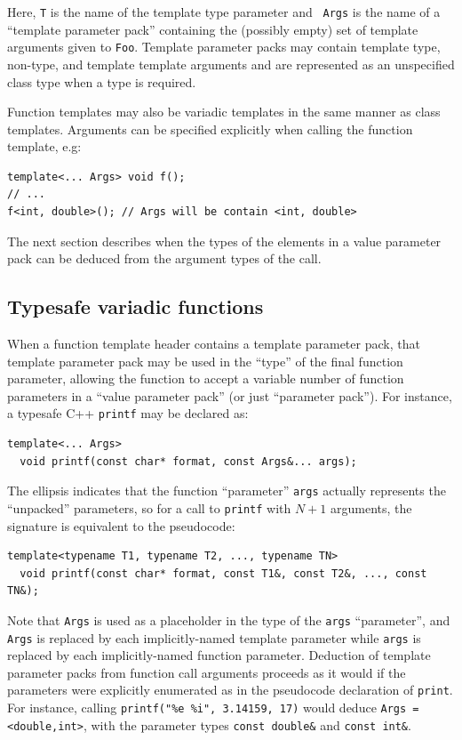 \documentclass{article}
\begin{document}
\noindent
Here, {\tt T} is the name of the template type parameter and {\tt
  Args} is the name of a ``template parameter pack'' containing the
(possibly empty) set of template arguments given to {\tt Foo}.
Template parameter packs may contain template type, non-type, and
template template arguments and are represented as an unspecified
class type when a type is required.

Function templates may also be variadic templates in the same manner
as class templates.  Arguments can be specified explicitly when
calling the function template, e.g:

\begin{verbatim}
template<... Args> void f();
// ... 
f<int, double>(); // Args will be contain <int, double>
\end{verbatim}
The next section describes when the types of the elements in 
a value parameter pack can be deduced from the argument types
of the call. 

\subsection{Typesafe variadic functions}
When a function template header contains a template parameter pack,
that template parameter pack may be used in the ``type'' of the final
function parameter, allowing the function to accept a variable number
of function parameters in a ``value parameter pack'' (or just
``parameter pack''). For instance, a typesafe C++ {\tt printf} may
be declared as:
\begin{verbatim}
template<... Args>
  void printf(const char* format, const Args&... args);
\end{verbatim}

\noindent The ellipsis indicates that the function ``parameter''
\texttt{args}
actually represents the ``unpacked'' parameters, so for a call to
\texttt{printf} with $N+1$ arguments, the signature is equivalent to
the pseudocode:

\begin{verbatim}
template<typename T1, typename T2, ..., typename TN>
  void printf(const char* format, const T1&, const T2&, ..., const TN&);
\end{verbatim}

\noindent 
Note that \texttt{Args} is used as a placeholder in the type of the
\texttt{args} ``parameter'', and \texttt{Args} is replaced by each
implicitly-named template parameter while \texttt{args} is replaced by
each implicitly-named function parameter. Deduction of template
parameter packs from function call arguments proceeds as it would if
the parameters were explicitly enumerated as in the pseudocode
declaration of \texttt{print}. For instance, calling
\texttt{printf("\%e \%i", 3.14159, 17)} would deduce \texttt{Args =
  <double,int>}, with the parameter types \texttt{const double\&} and
\texttt{const int\&}.
\end{document}
